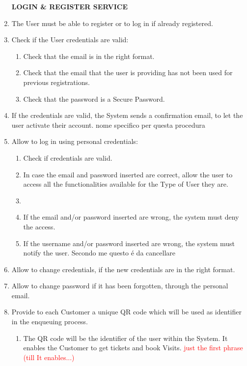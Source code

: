 \documentclass[a4paper, 10pt, oneside]{article}
\newcommand*{\lorenzo}[1]{\textcolor{BurntOrange}{#1}}
\newcommand{\yasmin}[1]{\textcolor{Red}{#1}}
\begin{document}
\begin{enumerate}[align=left]
    \item[\textbf{LOGIN \& REGISTER SERVICE}]
    \item \label{req:logOrReg} The User must be able to register or to log in if already registered.
    \item \label{req:credentialsCheck} Check if the User credentials are valid:
    \begin{enumerate}[label={-}]
        \item \label{req:credentialsCheck:email} Check that the email is in the right format.
        \item \label{req:credentialsCheck:uniqueness} Check that the email that the user is providing has not been used for previous registrations.
        \item \label{req:credentialsCheck:password}Check that the password is a Secure Password.
    \end{enumerate}
    \item \label{req:confirmRegistration}If the credentials are valid, the System sends a confirmation email, to let the user activate their account. \lorenzo{nome specifico per questa procedura}
    \item \label{req:login} Allow to log in using personal credentials:
    \begin{enumerate}[label={-}]
        \item \label{req:login:checkCred}Check if credentials are valid.
        \item \label{req:login:validCred} In case the email and password inserted are correct, allow the user to access all the functionalities available for the Type of User they are.
        \item \item \label{req:login:invalidCred} If the email and/or password inserted are wrong, the system must deny the access.
        \item If the username and/or password inserted are wrong, the system must notify the user. \lorenzo{Secondo me questo é da cancellare}
    \end{enumerate}
    \item \label{req:changeCredentials} Allow to change credentials, if the new credentials are in the right format.
    \item \label{req:changePassWithMail}Allow to change password if it has been forgotten, through the personal email.
    \item \label{req:provideQR} Provide to each Customer a unique QR code \lorenzo{which will be used as identifier in the enqueuing process}.
    \begin{enumerate}[label={-}]
        \item \label{req:provideQR:uniqueID} \lorenzo{The QR code will be the identifier of the user within the System. It enables the Customer to get tickets and book Visits.} \yasmin{just the first phrase (till It enables...)}
    \end{enumerate}
    

\end{enumerate}
\end{document}
